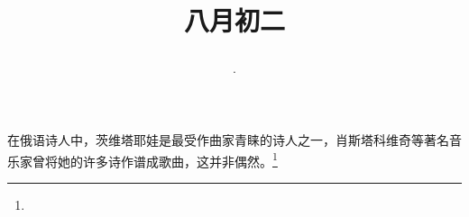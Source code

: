 \title{\date[d=4,m=9,y=2024][year:cn-y,年,month:cn,day:cn,日,·,weekday]·八月初二 }
在俄语诗人中，茨维塔耶娃是最受作曲家青睐的诗人之一，肖斯塔科维奇等著名音乐家曾将她的许多诗作谱成歌曲，这并非偶然。\footnote{ }

